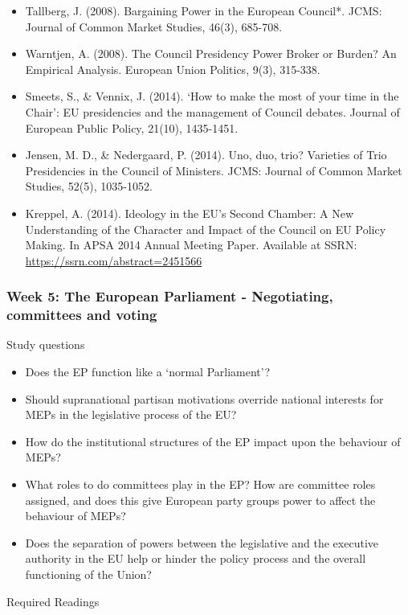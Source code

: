 \begin{itemize}
	\item Tallberg, J. (2008). Bargaining Power in the European Council*. JCMS: Journal of Common Market Studies, 46(3), 685-708.
	\item Warntjen, A. (2008). The Council Presidency Power Broker or Burden? An Empirical Analysis. European Union Politics, 9(3), 315-338.
	\item Smeets, S., \& Vennix, J. (2014). ‘How to make the most of your time in the Chair’: EU presidencies and the management of Council debates. Journal of European Public Policy, 21(10), 1435-1451.
	\item Jensen, M. D., \& Nedergaard, P. (2014). Uno, duo, trio? Varieties of Trio Presidencies in the Council of Ministers. JCMS: Journal of Common Market Studies, 52(5), 1035-1052.
	\item Kreppel, A. (2014). Ideology in the EU’s Second Chamber: A New Understanding of the Character and Impact of the Council on EU Policy Making. In APSA 2014 Annual Meeting Paper. Available at SSRN: \url{https://ssrn.com/abstract=2451566}	
\end{itemize}


\subsubsection*{Week 5: The European Parliament - Negotiating, committees and voting}

Study questions

\begin{itemize}
	\item Does the EP function like a `normal Parliament'?
	\item Should supranational partisan motivations override national interests for MEPs in the legislative process of the EU?
	\item How do the institutional structures of the EP impact upon the behaviour of MEPs?
	\item What roles to do committees play in the EP? How are committee roles assigned, and does this give European party groups power to affect the behaviour of MEPs?
	\item Does the separation of powers between the legislative and the executive authority in the EU help or hinder the policy process and the overall functioning of the Union?
\end{itemize}

\noindent Required Readings

